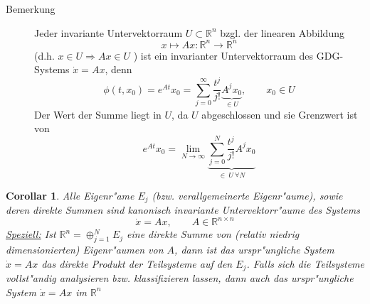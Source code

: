 \documentclass[a4paper, 13pt]{scrreprt}
\newtheorem{corollar}[theorem]{Corollar}
\theoremstyle{definition} \newtheorem{definition}{Definition}[section]
\newcommand{\RR}{\mathbb{R}}
\begin{document}
\begin{description}
\item [Bemerkung]
	Jeder invariante Untervektorraum \(U \subset \RR^n \) bzgl. der linearen Abbildung 
		\[x \mapsto Ax : \RR^n \rightarrow \RR^n \]
(d.h. $x\in U\Rightarrow Ax \in U$ ) ist ein invarianter Untervektorraum des GDG-Systems \(\dot{x} = Ax\), denn
		\[\phi(t,x_0) = e^{At} x_0 = \sum_{j=0}^{\infty} \frac{t^j}{j!} \underbrace{A^j x_0}_{\in U}, \qquad x_0 \in U\]
Der Wert der Summe liegt in \(U\), da $U$ abgeschlossen und sie Grenzwert ist von
	\[ e^{At} x_0 = \lim_{N\to \infty} \underbrace{\sum_{j=0}^{N} \frac{t^j}{j!} A^j x_0 }_{\in\  U\ \forall N} \]
\end{description}

\begin{corollar}
	Alle Eigenr"ame \(E_j\) (bzw. verallgemeinerte Eigenr"aume), sowie deren direkte Summen sind kanonisch invariante Untervektorr"aume des Systems
		\[\dot{x} = Ax, \qquad A \in \RR^{n\times n} \]
	\underline{Speziell:} Ist \(\RR^n = \oplus_{j=1}^{N} E_j \) eine direkte Summe von (relativ niedrig dimensionierten) Eigenr"aumen von \(A\), dann ist das urspr"ungliche System \(\dot{x}=Ax\) das direkte Produkt der Teilsysteme auf den \(E_j\).
	Falls sich die Teilsysteme vollst"andig analysieren bzw. klassifizieren lassen, dann auch das urspr"ungliche System \(\dot{x} = Ax\) im \(\RR^n\)
\end{corollar}
\end{document}
